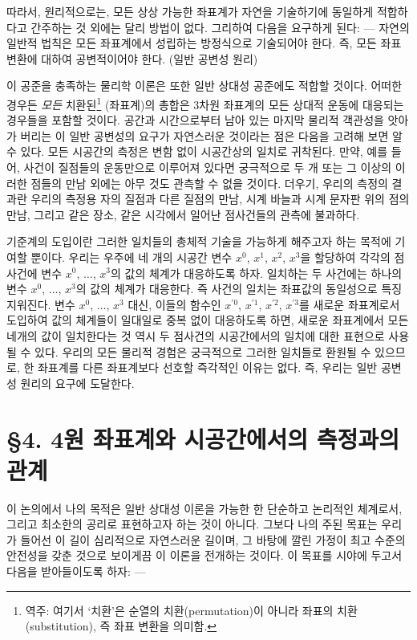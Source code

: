 \documentclass[b5paper]{article}
\begin{document}
따라서, 원리적으로는, 모든 상상 가능한 좌표계가 자연을 기술하기에 동일하게 적합하다고 간주하는 것 외에는 달리 방법이 없다. 그리하여 다음을 요구하게 된다: --- 자연의 일반적 법칙은 모든 좌표계에서 성립하는 방정식으로 기술되어야 한다. 즉, 모든 좌표 변환에 대하여 공변적이어야 한다. (일반 공변성 원리)

이 공준을 충족하는 물리학 이론은 또한 일반 상대성 공준에도 적합할 것이다. 어떠한 경우든 \emph{모든} 치환된\footnote{역주: 여기서 `치환'은 순열의 치환(permutation)이 아니라 좌표의 치환(substitution), 즉 좌표 변환을 의미함.} (좌표계)의 총합은 3차원 좌표계의 모든 상대적 운동에 대응되는 경우들을 포함할 것이다. 공간과 시간으로부터 남아 있는 마지막 물리적 객관성을 앗아가 버리는 이 일반 공변성의 요구가 자연스러운 것이라는 점은 다음을 고려해 보면 알 수 있다. 모든 시공간의 측정은 변함 없이 시공간상의 일치로 귀착된다. 만약, 예를 들어, 사건이 질점들의 운동만으로 이루어져 있다면 궁극적으로 두 개 또는 그 이상의 이러한 점들의 만남 외에는 아무 것도 관측할 수 없을 것이다. 더우기, 우리의 측정의 결과란 우리의 측정용 자의 질점과 다른 질점의 만남, 시계 바늘과 시계 문자판 위의 점의 만남, 그리고 같은 장소, 같은 시각에서 일어난 점사건들의 관측에 불과하다.

기준계의 도입이란 그러한 일치들의 총체적 기술을 가능하게 해주고자 하는 목적에 기여할 뿐이다. 우리는 우주에 네 개의 시공간 변수 $x^0$, $x^1$, $x^2$, $x^3$을 할당하여 각각의 점사건에 변수 $x^0$, $\dots$, $x^3$의 값의 체계가 대응하도록 하자. 일치하는 두 사건에는 하나의 변수 $x^0$, $\dots$, $x^3$의 값의 체계가 대응한다. 즉 사건의 일치는 좌표값의 동일성으로 특징지워진다. 변수 $x^0$, $\dots$, $x^3$ 대신, 이들의 함수인 $x^{\prime0}$, $x^{\prime1}$, $x^{\prime2}$, $x^{\prime3}$를 새로운 좌표계로서 도입하여 값의 체계들이 일대일로 중복 없이 대응하도록 하면, 새로운 좌표계에서 모든 네개의 값이 일치한다는 것 역시 두 점사건의 시공간에서의 일치에 대한 표현으로 사용될 수 있다. 우리의 모든 물리적 경험은 궁극적으로 그러한 일치들로 환원될 수 있으므로, 한 좌표계를 다른 좌표계보다 선호할 즉각적인 이유는 없다. 즉, 우리는 일반 공변성 원리의 요구에 도달한다.

\section*{\S 4. 4원 좌표계와 시공간에서의 측정과의 관계}

이 논의에서 나의 목적은 일반 상대성 이론을 가능한 한 단순하고 논리적인 체계로서, 그리고 최소한의 공리로 표현하고자 하는 것이 아니다. 그보다 나의 주된 목표는 우리가 들어선 이 길이 심리적으로 자연스러운 길이며, 그 바탕에 깔린 가정이 최고 수준의 안전성을 갖춘 것으로 보이게끔 이 이론을 전개하는 것이다. 이 목표를 시야에 두고서 다음을 받아들이도록 하자: ---
\end{document}
